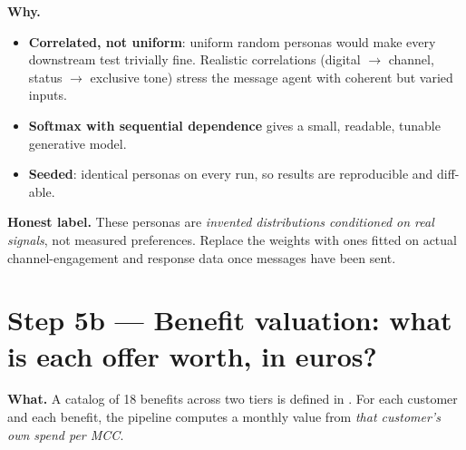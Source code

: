 \documentclass[11pt,a4paper]{article}
\newcommand{\code}[1]{\texttt{\detokenize{#1}}}
\newcommand{\why}[1]{\par\needspace{6\baselineskip}\smallskip\noindent\textbf{\textcolor{ca}{Why.}} #1\par}
\begin{document}
\why{
\begin{itemize}
\item \textbf{Correlated, not uniform}: uniform random personas would make every downstream test trivially fine. Realistic correlations (digital $\to$ channel, status $\to$ exclusive tone) stress the message agent with coherent but varied inputs.
\item \textbf{Softmax with sequential dependence} gives a small, readable, tunable generative model.
\item \textbf{Seeded}: identical personas on every run, so results are reproducible and diff-able.
\end{itemize}}

\begin{warnbox}
\textbf{Honest label.} These personas are \emph{invented distributions conditioned on real signals}, not measured
preferences. Replace the weights with ones fitted on actual channel-engagement and response data once messages have been sent.
\end{warnbox}

\section{Step 5b --- Benefit valuation: what is each offer worth, in euros?}

\textbf{What.} A catalog of 18 benefits across two tiers is defined in \code{benefits.csv}. For each customer and each benefit, the pipeline
computes a monthly value from \emph{that customer's own spend per MCC}.
\end{document}
